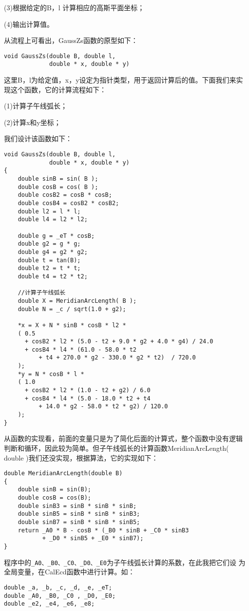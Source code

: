 (3)根据给定的B，l 计算相应的高斯平面坐标；

(4)输出计算值。

从流程上可看出，GaussZs函数的原型如下：
\begin{verbatim}
void GaussZs(double B, double l,
             double * x, double * y)
\end{verbatim}
这里B，l为给定值，x，y设定为指针类型，用于返回计算后的值。下面我们来实
现这个函数，它的计算流程如下：

(1)计算子午线弧长；

(2)计算x和y坐标；

我们设计该函数如下：
\begin{verbatim}
void GaussZs(double B, double l,
             double * x, double * y)
{
    double sinB = sin( B );
    double cosB = cos( B );
    double cosB2 = cosB * cosB;
    double cosB4 = cosB2 * cosB2;
    double l2 = l * l;
    double l4 = l2 * l2;

    double g = _eT * cosB;
    double g2 = g * g;
    double g4 = g2 * g2;
    double t = tan(B);
    double t2 = t * t;
    double t4 = t2 * t2;

    //计算子午线弧长
    double X = MeridianArcLength( B );
    double N = _c / sqrt(1.0 + g2);

    *x = X + N * sinB * cosB * l2 *
    ( 0.5
      + cosB2 * l2 * (5.0 - t2 + 9.0 * g2 + 4.0 * g4) / 24.0
      + cosB4 * l4 * (61.0 - 58.0 * t2
          + t4 + 270.0 * g2 - 330.0 * g2 * t2)  / 720.0
    );
    *y = N * cosB * l *
    ( 1.0
      + cosB2 * l2 * (1.0 - t2 + g2) / 6.0
      + cosB4 * l4 * (5.0 - 18.0 * t2 + t4
          + 14.0 * g2 - 58.0 * t2 * g2) / 120.0
    );
}
\end{verbatim}

从函数的实现看，前面的变量只是为了简化后面的计算式，整个函数中没有逻辑
判断和循环，因此较为简单。但子午线弧长的计算函数MeridianArcLength(
double )我们还没实现，根据算法，它的实现如下：
\begin{verbatim}
double MeridianArcLength(double B)
{
    double sinB = sin(B);
    double cosB = cos(B);
    double sinB3 = sinB * sinB * sinB;
    double sinB5 = sinB * sinB * sinB3;
    double sinB7 = sinB * sinB * sinB5;
    return _A0 * B - cosB * (_B0 * sinB + _C0 * sinB3
           + _D0 * sinB5 + _E0 * sinB7);
}
\end{verbatim}
程序中的\verb|_A0、_B0、_C0、_D0、_E0|为子午线弧长计算的系数，在此我把它们设
为全局变量，在CalEcd函数中进行计算。如：

\begin{verbatim}
double _a, _b, _c, _d, _e, _eT;
double _A0, _B0, _C0 , _D0, _E0;
double _e2, _e4, _e6, _e8;
\end{verbatim}

